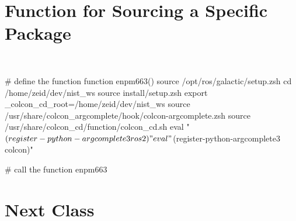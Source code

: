 \documentclass[usenames,11,dvipsnames,svgnames,x11names,aspectratio=1610,bibref]{beamer}
\newcommand{\mydisclaimer}{{\color{disclaimer}{\scriptsize ROS 2 -- Part I}}}
\newcommand{\iconColor}[1]{\textcolor{iconColor}{#1}}
\newcommand{\iconWarningColor}[1]{\textcolor{iconWarningColor}{#1}}
\newcommand\doublerulefill{\leavevmode\leaders\vbox{\hrule width .1pt\kern1pt\hrule}\hfill\kern0pt }
\renewcommand\sec{{\cnordSix{\secname}\hfill\mydisclaimer~} }
\newcommand{\mywarning}{\iconWarningColor{\faExclamationTriangle}\xspace}
\newcommand{\myinfo}{\iconColor{\faInfoCircle}\xspace}
\begin{document}

\section{Function for Sourcing a Specific Package}
\begin{frame}[fragile]{\sec}
\vspace*{\fill}
\begin{center} 

\begin{bashScriptList}
# define the function
function enpm663(){
  source /opt/ros/galactic/setup.zsh
  cd /home/zeid/dev/nist_ws
  source install/setup.zsh
  export _colcon_cd_root=/home/zeid/dev/nist_ws
  source /usr/share/colcon_argcomplete/hook/colcon-argcomplete.zsh
  source /usr/share/colcon_cd/function/colcon_cd.sh
  eval "$(register-python-argcomplete3 ros2)"
  eval "$(register-python-argcomplete3 colcon)"
}

# call the function
enpm663
\end{bashScriptList}

\end{center}
\vspace*{\fill}
\end{frame}




\section{Next Class}
\end{document}
